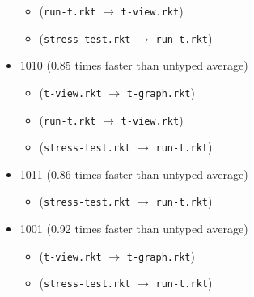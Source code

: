 \documentclass{article}
\newcommand{\mono}[1]{\texttt{#1}}
\begin{document}
\begin{itemize}
\begin{itemize}
  \item (\mono{run-t.rkt} $\rightarrow$ \mono{t-view.rkt})
  \item (\mono{stress-test.rkt} $\rightarrow$ \mono{run-t.rkt})
  \end{itemize}
\item 1010 (0.85 times faster than untyped average)
  \begin{itemize}
  \item (\mono{t-view.rkt} $\rightarrow$ \mono{t-graph.rkt})
  \item (\mono{run-t.rkt} $\rightarrow$ \mono{t-view.rkt})
  \item (\mono{stress-test.rkt} $\rightarrow$ \mono{run-t.rkt})
  \end{itemize}
\item 1011 (0.86 times faster than untyped average)
  \begin{itemize}
  \item (\mono{stress-test.rkt} $\rightarrow$ \mono{run-t.rkt})
  \end{itemize}
\item 1001 (0.92 times faster than untyped average)
  \begin{itemize}
  \item (\mono{t-view.rkt} $\rightarrow$ \mono{t-graph.rkt})
  \item (\mono{stress-test.rkt} $\rightarrow$ \mono{run-t.rkt})
  \end{itemize}


\end{itemize}
\end{document}
